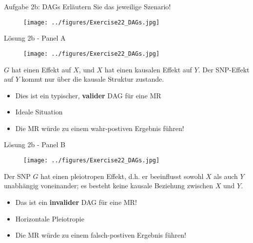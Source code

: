 \documentclass{beamer}
\begin{document}
\begin{frame}{Aufgabe 2b: DAGs}
Erläutern Sie das jeweilige Szenario!

\begin{figure}[h]
\begin{center}
\texttt{[image: ../figures/Exercise22\_DAGs.jpg]}
\label{fig:DAGs}
\end{center}
\end{figure}

\end{frame}

\begin{frame}{Lösung 2b - Panel A}
\begin{figure}[h]
\begin{center}
\texttt{[image: ../figures/Exercise22\_DAGs.jpg]}
\label{fig:DAGsA}
\end{center}
\end{figure}

$G$ hat einen Effekt auf $X$, und $X$ hat einen kausalen Effekt auf $Y$. Der SNP-Effekt auf $Y$ kommt nur über die kausale Struktur zustande. 

        \begin{itemize}
            \item Dies ist ein typischer, \textbf{valider} DAG für eine MR
            \item Ideale Situation
            \item Die MR würde zu einem wahr-postiven Ergebnis führen!
        \end{itemize}        
\end{frame}

\begin{frame}{Lösung 2b - Panel B}
\begin{figure}[h]
\begin{center}
\texttt{[image: ../figures/Exercise22\_DAGs.jpg]}
\label{fig:DAGsB}
\end{center}
\end{figure}

Der SNP $G$ hat einen pleiotropen Effekt, d.h. er beeinflusst sowohl $X$ als auch $Y$ unabhängig voneinander; es besteht keine kausale Beziehung zwischen $X$ und $Y$. 

        \begin{itemize}
            \item Das ist ein \textbf{invalider} DAG für eine MR! 
            \item Horizontale Pleiotropie
            \item Die MR würde zu einem falsch-postiven Ergebnis führen!
        \end{itemize} 
\end{frame}
\end{document}
